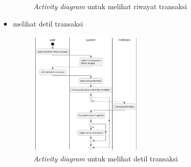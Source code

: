 \documentclass[a4paper]{article}
\begin{document}
\begin{enumerate}
\begin{enumerate}
\begin{itemize}
\begin{figure}[h]
                \caption{\textit{Activity diagram} untuk melihat riwayat transaksi}
            \end{figure}
            \item melihat detil transaksi
            \begin{figure}[h]
                \centering
                \includegraphics*[height=6cm]{./diagram/activity diagram/15. transaction/view transaction detail/view transaction detail.png}
                \caption{\textit{Activity diagram} untuk melihat detil transaksi}
            \end{figure}
        \end{itemize}
        \newpage
        

\end{enumerate}
\end{enumerate}
\end{document}
